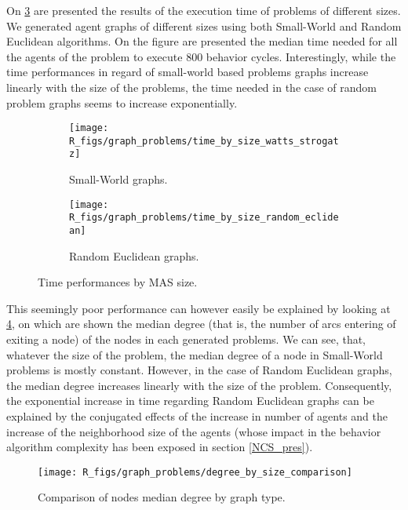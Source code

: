 On \figurename{} \ref{time_by_size_perfo} are presented the results of the execution time of problems of different sizes. We generated agent graphs of different sizes using both Small-World and Random Euclidean algorithms. On the figure are presented the median time needed for all the agents of the problem to execute 800 behavior cycles. Interestingly, while the time performances in regard of small-world based problems graphs increase linearly with the size of the problems, the time needed in the case of random problem graphs seems to increase exponentially.

\begin{figure}
\centering

	\begin{subfigure}[b]{0.45\textwidth}
		\texttt{[image: R\_figs/graph\_problems/time\_by\_size\_watts\_strogatz]}
		\caption{Small-World graphs.}\label{time_by_size_perfo:ws}
	\end{subfigure}
	\begin{subfigure}[b]{0.45\textwidth}
			\texttt{[image: R\_figs/graph\_problems/time\_by\_size\_random\_eclidean]}
		\caption{Random Euclidean graphs.}\label{time_by_size_perfo:re}
	\end{subfigure}

\caption{Time performances by MAS size.}\label{time_by_size_perfo}
\end{figure}

This seemingly poor performance can however easily be explained by looking at \figurename{} \ref{degree_by_size}, on which are shown the median degree (that is, the number of arcs entering of exiting a node) of the nodes in each generated problems. We can see, that, whatever the size of the problem, the median degree of a node in Small-World problems is mostly constant. However, in the case of Random Euclidean graphs, the median degree increases linearly with the size of the problem. Consequently, the exponential increase in time regarding Random Euclidean graphs can be explained by the conjugated effects of the increase in number of agents and the increase of the neighborhood size of the agents (whose impact in the behavior algorithm complexity has been exposed in section \ref{NCS_pres}).

\begin{figure}
\centering
			\texttt{[image: R\_figs/graph\_problems/degree\_by\_size\_comparison]}
\caption{Comparison of nodes median degree by graph type.}\label{degree_by_size}
\end{figure}

